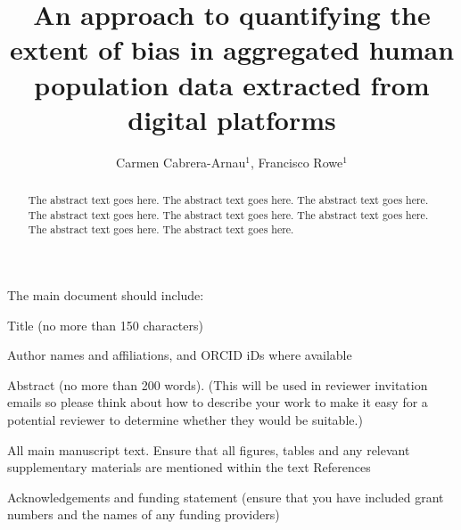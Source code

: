 \documentclass[]{rsos}%
\begin{document}
\title{An approach to quantifying the extent of bias in aggregated human population data extracted from digital platforms}

\author{
Carmen Cabrera-Arnau$^{1}$,
Francisco Rowe$^{1}$}

\address{
  $^{1}$Geographic Data Science Lab, Department of Geography and Planning, University of Liverpool, Liverpool, United Kingdom.\\
  $^{}$}
\subject{
subject 1,
subject 2,
subject 3}



\begin{abstract}
The abstract text goes here. The abstract text goes here. The abstract text goes here. The abstract text goes here. The abstract text goes here. The abstract text goes here. The abstract text goes here. The abstract text goes here.
\end{abstract}

\providecommand{\EndFirstPage}{%
}

\maketitle

The main document should include:

Title (no more than 150 characters)

Author names and affiliations, and ORCID iDs where available

Abstract (no more than 200 words). (This will be used in reviewer
invitation emails so please think about how to describe your work to
make it easy for a potential reviewer to determine whether they would be
suitable.)

All main manuscript text. Ensure that all figures, tables and any
relevant supplementary materials are mentioned within the text
References

Acknowledgements and funding statement (ensure that you have included
grant numbers and the names of any funding providers)
\end{document}
